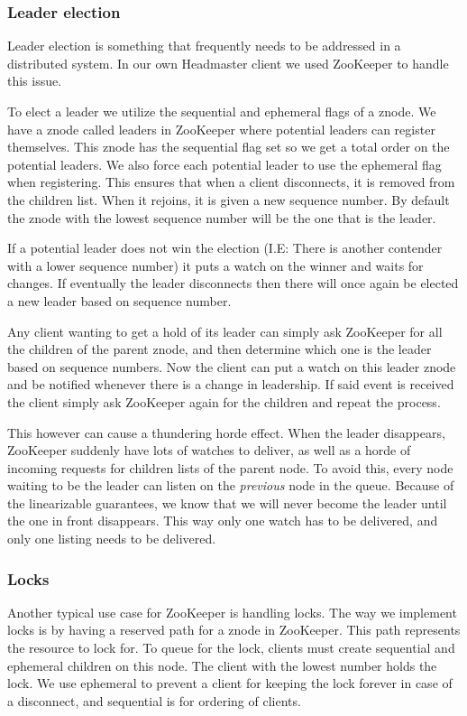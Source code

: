 \subsubsection{Leader election}
Leader election is something that frequently needs to be addressed in a distributed system. In our own Headmaster client we used ZooKeeper to handle this issue. 

To elect a leader we utilize the sequential and ephemeral flags of a znode. We have a znode called leaders in ZooKeeper where potential leaders can register themselves. This znode has the sequential flag set so we get a total order on the potential leaders. We also force each potential leader to use the ephemeral flag when registering. This ensures that when a client disconnects, it is removed from the children list. When it rejoins, it is given a new sequence number. By default the znode with the lowest sequence number will be the one that is the leader.

If a potential leader does not win the election (I.E: There is another contender with a lower sequence number) it puts a watch on the winner and waits for changes. If eventually the leader disconnects then there will once again be elected a new leader based on sequence number.

Any client wanting to get a hold of its leader can simply ask ZooKeeper for all the children of the parent znode, and then determine which one is the leader based on sequence numbers. Now the client can put a watch on this leader znode and be notified whenever there is a change in leadership. If said event is received the client simply ask ZooKeeper again for the children and repeat the process.

This however can cause a thundering horde effect. When the leader disappears, ZooKeeper suddenly have lots of watches to deliver, as well as a horde of incoming requests for children lists of the parent node. To avoid this, every node waiting to be the leader can listen on the \emph{previous} node in the queue. Because of the linearizable guarantees, we know that we will never become the leader until the one in front disappears. This way only one watch has to be delivered, and only one listing needs to be delivered.

\subsubsection{Locks}
Another typical use case for ZooKeeper is handling locks. The way we implement locks is by having a reserved path for a znode in ZooKeeper. This path represents the resource to lock for. To queue for the lock, clients must create sequential and ephemeral children on this node. The client with the lowest number holds the lock. We use ephemeral to prevent a client for keeping the lock forever in case of a disconnect, and sequential is for ordering of clients.

